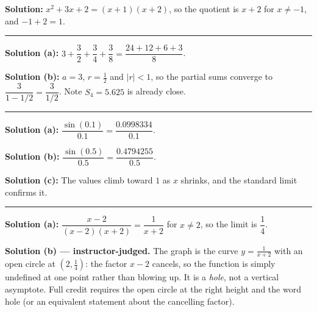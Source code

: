\documentclass[12pt]{article}
\begin{document}

\textbf{Solution:} \quad $x^2 + 3x + 2 = (x+1)(x+2)$, so the quotient is $x + 2$ for
$x \ne -1$, and $-1 + 2 = 1$. 

\vspace{0.15cm}\noindent\rule{\linewidth}{0.2pt}\vspace{0.15cm}


\textbf{Solution (a):} \quad $3 + \dfrac{3}{2} + \dfrac{3}{4} + \dfrac{3}{8}
= \dfrac{24 + 12 + 6 + 3}{8}$. 

\textbf{Solution (b):} \quad $a = 3$, $r = \frac{1}{2}$ and $|r| < 1$, so the partial sums
converge to $\dfrac{3}{1 - 1/2} = \dfrac{3}{1/2}$. Note $S_4 = 5.625$ is already close.

\vspace{0.15cm}\noindent\rule{\linewidth}{0.2pt}\vspace{0.15cm}


\textbf{Solution (a):} \quad $\dfrac{\sin(0.1)}{0.1} = \dfrac{0.0998334}{0.1}$. 

\textbf{Solution (b):} \quad $\dfrac{\sin(0.5)}{0.5} = \dfrac{0.4794255}{0.5}$. 

\textbf{Solution (c):} \quad The values climb toward $1$ as $x$ shrinks, and the standard
limit confirms it. 

\vspace{0.15cm}\noindent\rule{\linewidth}{0.2pt}\vspace{0.15cm}


\textbf{Solution (a):} \quad $\dfrac{x-2}{(x-2)(x+2)} = \dfrac{1}{x+2}$ for $x \ne 2$, so the
limit is $\dfrac{1}{4}$. 

\textbf{Solution (b) --- instructor-judged.} \quad The graph is the curve $y = \frac{1}{x+2}$
with an open circle at $\left(2, \frac{1}{4}\right)$: the factor $x-2$ cancels, so the function
is simply undefined at one point rather than blowing up. It is a \emph{hole}, not a vertical
asymptote. Full credit requires the open circle at the right height and the word hole (or an
equivalent statement about the cancelling factor).
\end{document}
